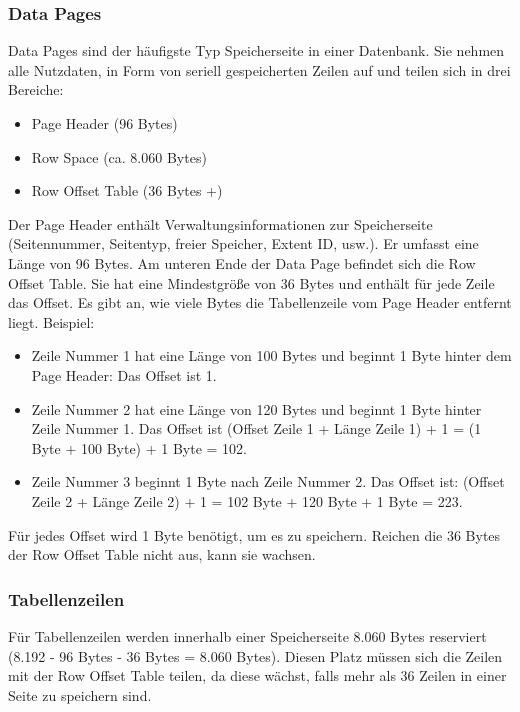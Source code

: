         \subsubsection{Data Pages}
          Data Pages sind der häufigste Typ Speicherseite in einer Datenbank.
          Sie nehmen alle  Nutzdaten, in Form von seriell gespeicherten Zeilen
          auf und teilen sich in drei Bereiche: 
          \begin{itemize}
            \item Page Header (96 Bytes)
            \item Row Space (ca. 8.060 Bytes)
            \item Row Offset Table (36 Bytes +)
          \end{itemize}
          Der Page Header enthält Verwaltungsinformationen zur Speicherseite
          (Seitennummer, Seitentyp, freier Speicher, Extent ID, usw.). Er
          umfasst eine Länge von 96 Bytes. Am unteren Ende der Data Page
          befindet sich die Row Offset Table. Sie hat eine Mindestgröße
          von 36 Bytes und enthält für jede Zeile das Offset. Es gibt
          an, wie viele Bytes die Tabellenzeile vom Page Header entfernt liegt.
          Beispiel:
\clearpage
          \begin{itemize}
            \item Zeile Nummer 1 hat eine Länge von 100 Bytes und beginnt 1
            Byte hinter dem Page Header: Das Offset ist 1.
            \item Zeile Nummer 2 hat eine Länge von 120 Bytes und beginnt 1
            Byte hinter Zeile Nummer 1. Das Offset ist (Offset Zeile 1 +
            Länge Zeile 1) + 1 = (1 Byte + 100 Byte) + 1 Byte = 102.
            \item Zeile Nummer 3 beginnt 1 Byte nach Zeile Nummer 2. Das Offset
            ist: (Offset Zeile 2 + Länge Zeile 2) + 1 = 102 Byte + 120 Byte +
            1 Byte = 223.
          \end{itemize}
          \begin{merke}
            Für jedes Offset wird 1 Byte benötigt, um es zu speichern. Reichen
            die 36 Bytes der Row Offset Table nicht aus, kann sie wachsen.
          \end{merke}
        \subsubsection{Tabellenzeilen}
          Für Tabellenzeilen werden innerhalb einer Speicherseite 8.060 Bytes
          reserviert (8.192 - 96 Bytes - 36 Bytes = 8.060 Bytes). Diesen Platz
          müssen sich die Zeilen mit der Row Offset Table teilen, da diese
          wächst, falls mehr als 36 Zeilen in einer Seite zu speichern sind.

